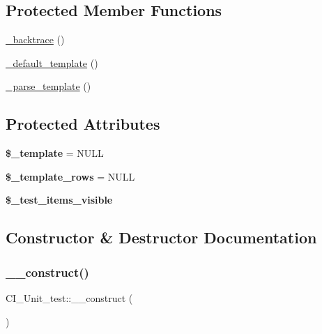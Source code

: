 \subsection*{Protected Member Functions}
\begin{DoxyCompactItemize}
\item 
\mbox{\hyperlink{class_c_i___unit__test_aac2171b9c9a8e3365412af12f62d7cf8}{\+\_\+backtrace}} ()
\item 
\mbox{\hyperlink{class_c_i___unit__test_a84be884853f375c13c8b2a17a5b649bd}{\+\_\+default\+\_\+template}} ()
\item 
\mbox{\hyperlink{class_c_i___unit__test_a0c7c0f5edc7aa493762e58af1563a3d3}{\+\_\+parse\+\_\+template}} ()
\end{DoxyCompactItemize}
\subsection*{Protected Attributes}
\begin{DoxyCompactItemize}
\item 
\mbox{\label{class_c_i___unit__test_ad2872e945ef7c490cfaf9b7b65ac864a}} 
{\bfseries \$\+\_\+template} = N\+U\+LL
\item 
\mbox{\label{class_c_i___unit__test_a592757eba19aea28f497a7f2d1d25b8d}} 
{\bfseries \$\+\_\+template\+\_\+rows} = N\+U\+LL
\item 
{\bfseries \$\+\_\+test\+\_\+items\+\_\+visible}
\end{DoxyCompactItemize}


\subsection{Constructor \& Destructor Documentation}
\mbox{\label{class_c_i___unit__test_a7bb42eb0a8066d4941c7bc03cb75c226}} 
\subsubsection{\texorpdfstring{\+\_\+\+\_\+construct()}{\_\_construct()}}
{\footnotesize\ttfamily C\+I\+\_\+\+Unit\+\_\+test\+::\+\_\+\+\_\+construct (\begin{DoxyParamCaption}{ }\end{DoxyParamCaption})}

